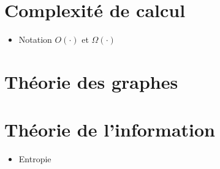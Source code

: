 \begin{comment}
\end{comment}

\appendix
\renewcommand\chapterstring{Annexe}

\chapter{Complexité de calcul}
\label{chap:complexite_calcul}

\begin{itemize}
  \item Notation $O(\cdot)$ et $\Omega(\cdot)$
\end{itemize}

\chapter{Théorie des graphes}
\label{chap:theo_graphe}

\chapter{Théorie de l'information}
\label{chap:theo_info}

\begin{itemize}
  \item Entropie
\end{itemize}



